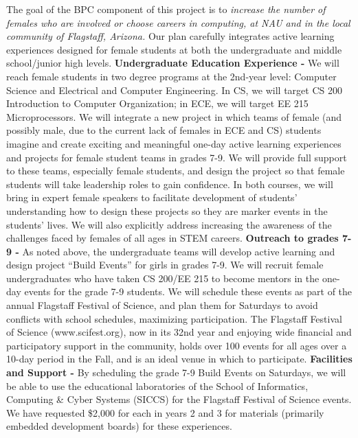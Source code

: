 The goal of the BPC component of this project is to \textit{increase the number of females who are involved or choose careers in computing, at NAU and in the local community of Flagstaff, Arizona.}  Our plan carefully integrates active learning experiences designed for female students at both the undergraduate and middle school/junior high levels.
\textbf{Undergraduate Education Experience -} We will reach female students in two degree programs at the 2nd-year level: Computer Science and Electrical and Computer Engineering. In CS, we will target CS 200 Introduction to Computer Organization; in ECE, we will target EE 215 Microprocessors. We will integrate a new project in which teams of female (and possibly male, due to the current lack of females in ECE and CS) students imagine and create exciting and meaningful one-day active learning experiences and projects for female student teams in grades 7-9.  We will provide full support to these teams, especially female students, and design the project so that female students will take leadership roles to gain confidence.  In both courses, we will bring in expert female speakers to facilitate development of students’ understanding how to design these projects so they are marker events in the students’ lives. We will also explicitly address increasing the awareness of the challenges faced by females of all ages in STEM careers.
\textbf{Outreach to grades 7-9 -} As noted above, the undergraduate teams will develop active learning and design project “Build Events” for girls in grades 7-9. We will recruit female undergraduates who have taken CS 200/EE 215 to become mentors in the one-day events for the grade 7-9 students.  We will schedule these events as part of the annual Flagstaff Festival of Science, and plan them for Saturdays to avoid conflicts with school schedules, maximizing participation. The Flagstaff Festival of Science (www.scifest.org), now in its 32nd year and enjoying wide financial and participatory support in the community, holds over 100 events for all ages over a 10-day period in the Fall, and is an ideal venue in which to participate.
\textbf{Facilities and Support -} By scheduling the grade 7-9 Build Events on Saturdays, we will be able to use the educational laboratories of the School of Informatics, Computing \& Cyber Systems (SICCS) for the Flagstaff Festival of Science events. We have requested \$2,000 for each in years 2 and 3 for materials (primarily embedded development boards) for these experiences.